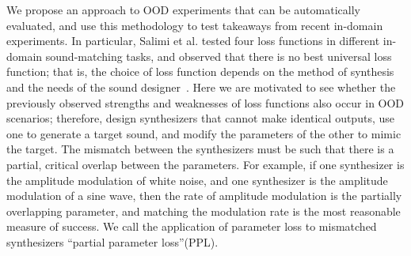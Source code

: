 \documentclass[10pt]{article} %
\newcommand{\anon}[1]{\textcolor[RGB]{255,50,150}{#1}}
\begin{document}



We propose an approach to OOD experiments that can be automatically evaluated, and use this methodology to test takeaways from recent in-domain experiments. In particular, \anon{Salimi et al.} tested four loss functions in different in-domain sound-matching tasks, and observed that there is no best universal loss function; that is, the choice of loss function depends on the method of synthesis and the needs of the sound designer~\cite{salimi2025evaluating}. Here we are motivated to see whether the previously observed strengths and weaknesses of loss functions also occur in OOD scenarios; therefore, design synthesizers that cannot make identical outputs, use one to generate a target sound, and modify the parameters of the other to mimic the target. The mismatch between the synthesizers must be such that there is a partial, critical overlap between the parameters. For example, if one synthesizer is the amplitude modulation of white noise, and one synthesizer is the amplitude modulation of a sine wave, then the rate of amplitude modulation is the partially overlapping parameter, and matching the modulation rate is the most reasonable measure of success. We call the application of parameter loss to mismatched synthesizers ``partial parameter loss''(PPL). 

\end{document}
